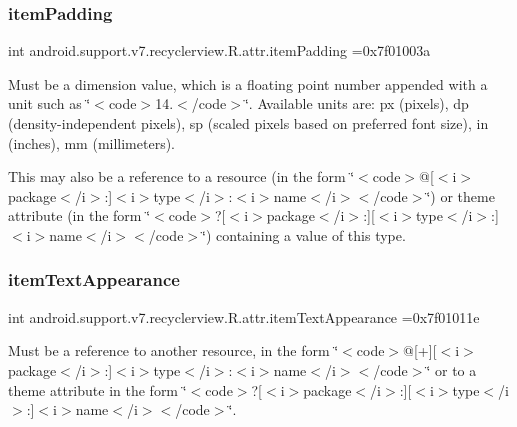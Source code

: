 \subsubsection{\texorpdfstring{item\+Padding}{itemPadding}}
{\footnotesize\ttfamily int android.\+support.\+v7.\+recyclerview.\+R.\+attr.\+item\+Padding =0x7f01003a\hspace{0.3cm}{\ttfamily [static]}}

Must be a dimension value, which is a floating point number appended with a unit such as \char`\"{}$<$code$>$14.\+5sp$<$/code$>$\char`\"{}. Available units are\+: px (pixels), dp (density-\/independent pixels), sp (scaled pixels based on preferred font size), in (inches), mm (millimeters). 

This may also be a reference to a resource (in the form \char`\"{}$<$code$>$@\mbox{[}$<$i$>$package$<$/i$>$\+:\mbox{]}$<$i$>$type$<$/i$>$\+:$<$i$>$name$<$/i$>$$<$/code$>$\char`\"{}) or theme attribute (in the form \char`\"{}$<$code$>$?\mbox{[}$<$i$>$package$<$/i$>$\+:\mbox{]}\mbox{[}$<$i$>$type$<$/i$>$\+:\mbox{]}$<$i$>$name$<$/i$>$$<$/code$>$\char`\"{}) containing a value of this type. \mbox{\label{classandroid_1_1support_1_1v7_1_1recyclerview_1_1R_1_1attr_af7017004a16c94dc53fcdeef25d39cb5}} 
\subsubsection{\texorpdfstring{item\+Text\+Appearance}{itemTextAppearance}}
{\footnotesize\ttfamily int android.\+support.\+v7.\+recyclerview.\+R.\+attr.\+item\+Text\+Appearance =0x7f01011e\hspace{0.3cm}{\ttfamily [static]}}

Must be a reference to another resource, in the form \char`\"{}$<$code$>$@\mbox{[}+\mbox{]}\mbox{[}$<$i$>$package$<$/i$>$\+:\mbox{]}$<$i$>$type$<$/i$>$\+:$<$i$>$name$<$/i$>$$<$/code$>$\char`\"{} or to a theme attribute in the form \char`\"{}$<$code$>$?\mbox{[}$<$i$>$package$<$/i$>$\+:\mbox{]}\mbox{[}$<$i$>$type$<$/i$>$\+:\mbox{]}$<$i$>$name$<$/i$>$$<$/code$>$\char`\"{}. \mbox{\label{classandroid_1_1support_1_1v7_1_1recyclerview_1_1R_1_1attr_ab3fa3defb2d472a406e2028f986cafa3}} 
